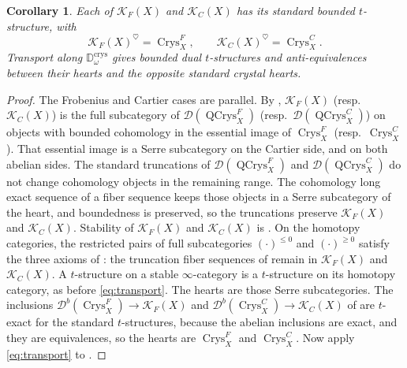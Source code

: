 \documentclass[11pt]{amsart}
\newcommand{\Crys}{\operatorname{Crys}}
\newcommand{\QCrys}{\operatorname{QCrys}}
\newcommand{\Db}{\mathcal D^b}
\newcommand{\KF}{\mathcal K_F}
\newcommand{\KC}{\mathcal K_C}
\theoremstyle{plain}
\newtheorem{corollary}[corollary]{Corollary}
\theoremstyle{definition}
\numberwithin{equation}{section}
\begin{document}
\begin{corollary}\label{cor:crystal-t}
Each of $\KF(X)$ and $\KC(X)$ has its standard bounded $t$-structure, with
\[
 \KF(X)^{\heartsuit}=\Crys^F_X,\qquad
 \KC(X)^{\heartsuit}=\Crys^C_X.
\]
Transport along $\mathbb D^{\mathrm{crys}}_\omega$ gives bounded dual $t$-structures and anti-equivalences between their hearts and the opposite standard crystal hearts.
\end{corollary}
\begin{proof}
The Frobenius and Cartier cases are parallel.
By , $\KF(X)$ (resp.\ $\KC(X)$) is the full subcategory of $\mathcal D(\QCrys^F_X)$ (resp.\ $\mathcal D(\QCrys^C_X)$) on objects with bounded cohomology in the essential image of $\Crys^F_X$ (resp.\ $\Crys^C_X$).
That essential image is a Serre subcategory \cite[Lemma 3.3.6]{Bau} on the Cartier side, and \cite[Proposition 3.4.2(b)(c)]{BP} on both abelian sides.
The standard truncations of $\mathcal D(\QCrys^F_X)$ and $\mathcal D(\QCrys^C_X)$ do not change cohomology objects in the remaining range.
The cohomology long exact sequence of a fiber sequence keeps those objects in a Serre subcategory of the heart, and boundedness is preserved, so the truncations preserve $\KF(X)$ and $\KC(X)$.
Stability of $\KF(X)$ and $\KC(X)$ is .
On the homotopy categories, the restricted pairs of full subcategories $(\cdot)^{\leq0}$ and $(\cdot)^{\geq0}$ satisfy the three axioms of \cite[Definition 1.2.1.1]{HA}: the truncation fiber sequences of \cite[Remark 1.2.1.8]{HA} remain in $\KF(X)$ and $\KC(X)$.
A $t$-structure on a stable $\infty$-category is a $t$-structure on its homotopy category, as before \eqref{eq:transport}.
The hearts are those Serre subcategories.
The inclusions $\Db(\Crys^F_X)\to\KF(X)$ and $\Db(\Crys^C_X)\to\KC(X)$ of  are $t$-exact for the standard $t$-structures, because the abelian inclusions are exact, and they are equivalences, so the hearts are $\Crys^F_X$ and $\Crys^C_X$.
Now apply \eqref{eq:transport} to .
\end{proof}
\end{document}
